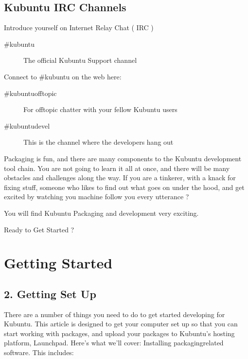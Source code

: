 \documentclass[letterpaper,10pt,english]{sphinxmanual}
\begin{document}
\subsection{Kubuntu IRC Channels}
\label{\detokenize{docs/packaging_guide/welcome:kubuntu-irc-channels}}
\sphinxAtStartPar
Introduce yourself on Internet Relay Chat ( IRC )
\begin{description}
\item[{\#kubuntu}] \leavevmode
\sphinxAtStartPar
The official Kubuntu Support channel

\end{description}

\sphinxAtStartPar
Connect to \#kubuntu on the web here: 
\begin{description}
\item[{\#kubuntu\sphinxhyphen{}offtopic}] \leavevmode
\sphinxAtStartPar
For off\sphinxhyphen{}topic chatter with your fellow Kubuntu users

\item[{\#kubuntu\sphinxhyphen{}devel}] \leavevmode
\sphinxAtStartPar
This is the channel where the developers hang out

\end{description}

\sphinxAtStartPar
Packaging is fun, and there are many components to the Kubuntu development tool chain. You are not going to learn it all at once, and there will be many obstacles and challenges along the way.
If you are a tinkerer, with a knack for fixing stuff, someone who likes to find out what goes on under the hood, and get excited by watching you machine follow you every utterance ?

\sphinxAtStartPar
You will find Kubuntu Packaging and development very exciting.

\sphinxAtStartPar
Ready to Get Started ?


\section{Getting Started}
\label{\detokenize{docs/packaging_guide/getting_started:getting-started}}\label{\detokenize{docs/packaging_guide/getting_started::doc}}

\subsection{2. Getting Set Up}
\label{\detokenize{docs/packaging_guide/getting_started:getting-set-up}}
\sphinxAtStartPar
There are a number of things you need to do to get started developing for Kubuntu. This article is designed to get your computer set up so that you can start working with packages, and upload your packages to Kubuntu’s hosting platform, Launchpad. Here’s what we’ll cover:
Installing packaging\sphinxhyphen{}related software. This includes:
\end{document}
